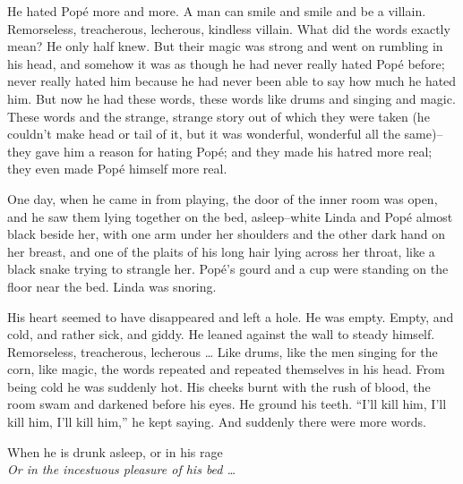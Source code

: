 \documentclass[12pt]{report}
\begin{document}
He hated Popé more and more. A man can smile and smile and be a villain.
Remorseless, treacherous, lecherous, kindless villain. What did the
words exactly mean? He only half knew. But their magic was strong and
went on rumbling in his head, and somehow it was as though he had never
really hated Popé before; never really hated him because he had never
been able to say how much he hated him. But now he had these words,
these words like drums and singing and magic. These words and the
strange, strange story out of which they were taken (he couldn't make
head or tail of it, but it was wonderful, wonderful all the same)--they
gave him a reason for hating Popé; and they made his hatred more real;
they even made Popé himself more real.

One day, when he came in from playing, the door of the inner room was
open, and he saw them lying together on the bed, asleep--white Linda and
Popé almost black beside her, with one arm under her shoulders and the
other dark hand on her breast, and one of the plaits of his long hair
lying across her throat, like a black snake trying to strangle her.
Popé's gourd and a cup were standing on the floor near the bed. Linda
was snoring.

His heart seemed to have disappeared and left a hole. He was empty.
Empty, and cold, and rather sick, and giddy. He leaned against the wall
to steady himself. Remorseless, treacherous, lecherous \ldots{} Like
drums, like the men singing for the corn, like magic, the words repeated
and repeated themselves in his head. From being cold he was suddenly
hot. His cheeks burnt with the rush of blood, the room swam and darkened
before his eyes. He ground his teeth. ``I'll kill him, I'll kill him,
I'll kill him,'' he kept saying. And suddenly there were more words.

\emph{}

When he is drunk asleep, or in his rage\\

\emph{Or in the incestuous pleasure of his bed \ldots{}\\
}
\end{document}
